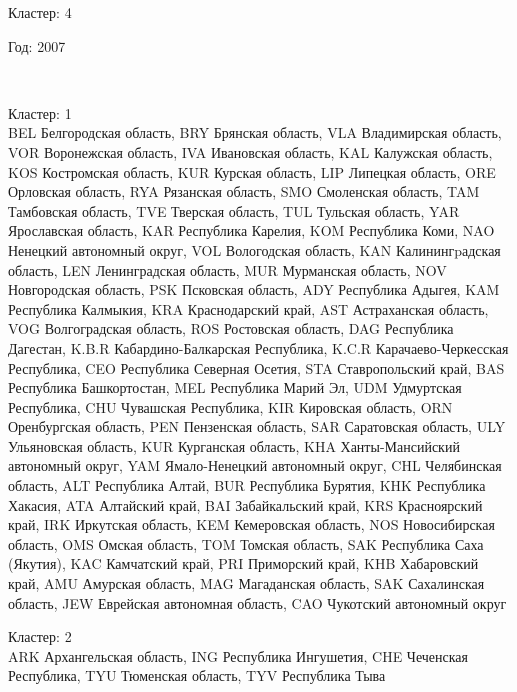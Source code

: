 \documentclass[11pt]{article}
\begin{document}
Кластер:  4 \\

\begin{center}
Год:  2007
\end{center}

    \begin{center}
    \end{center}
    { \hspace*{\fill} \\}
    

Кластер:  1 \\
BEL Белгородская область, BRY Брянская область, VLA Владимирская область, VOR Воронежская область, IVA Ивановская область, KAL Калужская область, KOS Костромская область, KUR Курская область, LIP Липецкая область, ORE Орловская область, RYA Рязанская область, SMO Смоленская область, TAM Тамбовская область, TVE Тверская область, TUL Тульская область, YAR Ярославская область, KAR Республика Карелия, KOM Республика Коми, NAO Ненецкий автономный округ, VOL Вологодская область, KAN Калинингpадская область, LEN Ленинградская область, MUR Мурманская область, NOV Новгородская область, PSK Псковская область, ADY Республика Адыгея, KAM Республика Калмыкия, KRA Краснодарский край, AST Астраханская область, VOG Волгоградская область, ROS Ростовская область, DAG Республика Дагестан, K.B.R Кабардино-Балкарская Республика, K.C.R Карачаево-Черкесская Республика, CEO Республика Северная Осетия, STA Ставропольский край, BAS Республика Башкортостан, MEL Республика Марий Эл, UDM Удмуртская Республика, CHU Чувашская Республика, KIR Кировская область, ORN Оренбургская область, PEN Пензенская область, SAR Саратовская область, ULY Ульяновская область, KUR Курганская область, KHA Ханты-Мансийский автономный округ, YAM Ямало-Ненецкий автономный округ, CHL Челябинская область, ALT Республика Алтай, BUR Республика Бурятия, KHK Республика Хакасия, ATA Алтайский край, BAI Забайкальский край, KRS Красноярский край, IRK Иркутская область, KEM Кемеровская область, NOS Новосибирская область, OMS Омская область, TOM Томская область, SAK Республика Саха (Якутия), KAC Камчатский край, PRI Приморский край, KHB Хабаровский край, AMU Амурская область, MAG Магаданская область, SAK Сахалинская область, JEW Еврейская автономная область, CAO Чукотский автономный округ

Кластер:  2 \\
ARK Архангельская область, ING Республика Ингушетия, CHE Чеченская Республика, TYU Тюменская область, TYV Республика Тыва
\end{document}
